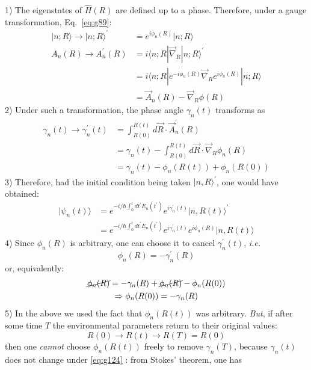 \documentclass[12pt]{article}
\newcommand{\be}{\begin{equation}}
\newcommand{\ee}{\end{equation}}
\begin{document}
1) The eigenstates of $\hat{H}(R)$ are defined up to
a phase. Therefore, under a gauge transformation,
Eq.~\eqref{eq:g89}:
\be
\begin{aligned}
|n ; R\rangle \rightarrow|n ; R\rangle^{\prime} 
&=e^{i \phi_{n}(R)}|n ; R\rangle \\
A_{n}(R) \rightarrow A_{n}^{\prime}(R) 
&=i\langle n ; R| \vec{\nabla}_{\!R} |n ; R\rangle^{\prime} \\ 
&=i\langle n ; R| e^{-i \phi_{n}(R)} \vec{\nabla}_{\!R}  e^{i \phi_{n}(R)}|n ; R\rangle\\ 
&=\vec{A}_{n}(R)-\vec{\nabla}_{\!R}  \phi(R) 
\end{aligned}
\ee
2) Under such a transformation, the phase angle $\gamma_{n}(t)$
transforms as
\be
\begin{aligned} 
\gamma_{n}(t) \rightarrow \gamma_{n}^{\prime}(t) 
&=\int_{R(0)}^{R(t)} d \vec{R} \cdot \vec{A}_{n}^{\prime}(R) \\ 
&=\gamma_{n}(t)-\int_{R(0)}^{R(t)} d \vec{R} \cdot \vec{\nabla}_{\!R}  \phi_{n}(R) \\
&=\gamma_{n}(t)-\phi_{n}(R(t))+\phi_{n}(R(0))
\end{aligned}
\ee
3) Therefore, had the initial condition being
taken $|n, R\rangle^{\prime}$, one would have obtained:
\be
\begin{aligned} 
|\psi_{n}(t)\rangle
&=e^{-i / \hbar \int_{0}^{t} d t^{\prime} E_{n}\left(t^{\prime}\right)} e^{i \gamma_{n}^{\prime}(t)}|n, R(t)\rangle^{\prime}\\
&=e^{-i / \hbar \int_{0}^{t} d t^{\prime} E_{n}\left(t^{\prime}\right)} e^{i \gamma_{n}^{\prime}(t)}e^{i\phi_n(R)}|n, R(t)\rangle
\end{aligned} 
\ee
4) Since $\phi_{n}(R)$ is arbitrary, one can choose it
to cancel $\gamma_{n}^{\prime}(t)$, \textit{i.e.}
\be
\phi_{n}(R)=-\gamma_{n}^{\prime}(R)
\ee
or, equivalently:
\be
\begin{gathered}
\cancel{\phi_{n}(R)}=-\gamma_{n}(R)+\cancel{\phi_{n}(R)}-\phi_{n}(R(0))\\
\Rightarrow \phi_{n}(R(0))=-\gamma_{n}(R)
\end{gathered}
\ee
5) In the above we used the fact that
$\phi_{n}(R(t))$ was arbitrary. \emph{But}, if after some
time $T$ the environmental parameters return to
their original values:
\be
R(0) \rightarrow R(t) \rightarrow R(T)=R(0)
\label{eq:g124}
\ee
then one \emph{cannot} choose $\phi_{n}(R(t))$ freely to
remove $\gamma_{n}(T)$, because $\gamma_{n}(t)$ does not change
under \eqref{eq:g124} : from Stokes' theorem, one has
\end{document}
